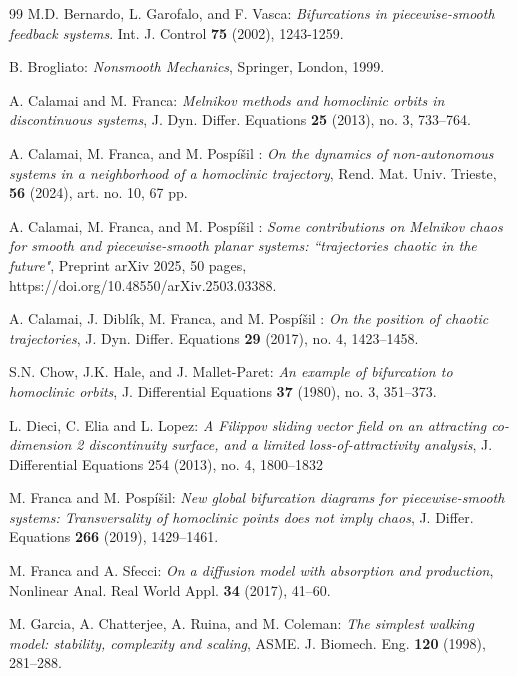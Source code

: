 \documentclass[10pt]{article}
\numberwithin{equation}{section}
\theoremstyle{definition}
\theoremstyle{remark}
\begin{document}
\begin{thebibliography}{99}
 {\sc M.D. Bernardo, L. Garofalo, and F. Vasca}: {\it Bifurcations in
piecewise-smooth feedback systems}. Int. J. Control \textbf{75} (2002),
1243-1259.

 {\sc B. Brogliato}: {\it Nonsmooth Mechanics}, Springer, London,
1999.

	 {\sc A. Calamai and M. Franca}: {\it Melnikov methods and homoclinic orbits in discontinuous systems},
	J. Dyn. Differ. Equations {\bf 25} (2013), no. 3, 733--764.
	
  {\sc A. Calamai, M. Franca, and M. Posp\' i\v sil }:   {\it On the dynamics of non-autonomous systems in a neighborhood of a homoclinic trajectory},
Rend. Mat. Univ. Trieste, {\bf 56} (2024), art. no. 10, 67 pp.
	


  {\sc A. Calamai, M. Franca, and M. Posp\' i\v sil }:  {\it Some contributions on Melnikov chaos for smooth and piecewise-smooth planar systems:
``trajectories chaotic in the future"},
Preprint arXiv 2025, 50 pages, https://doi.org/10.48550/arXiv.2503.03388.

	  {\sc A. Calamai, J. Dibl\' ik, M. Franca, and M. Posp\' i\v sil }: {\it On the position of chaotic trajectories},  J. Dyn.
Differ. Equations {\bf 29}
(2017), no. 4, 1423--1458.

 {\sc S.N. Chow, J.K. Hale, and J. Mallet-Paret}: {\it An example of bifurcation to homoclinic orbits},
J. Differential Equations {\bf 37} (1980), no. 3, 351--373.
	

      {\sc L. Dieci, C. Elia and L. Lopez}: {\it A Filippov sliding vector field on an attracting co-dimension 2 discontinuity
      surface, and a limited
      loss-of-attractivity analysis}, J. Differential Equations 254 (2013), no. 4, 1800--1832
	
	 {\sc  M. Franca and M. Posp\' i\v sil}: {\it New global bifurcation diagrams for piecewise-smooth systems: Transversality
of homoclinic points does not
imply chaos},
	J.  Differ. Equations {\bf 266} (2019), 1429--1461.

{\sc M. Franca and A. Sfecci}: {\it On a diffusion model with absorption and production},
Nonlinear Anal. Real World Appl. \textbf{34} (2017), 41--60.

 {\sc M. Garcia, A. Chatterjee, A. Ruina, and M. Coleman}: {\it The
simplest walking model: stability, complexity and scaling},
ASME. J. Biomech. Eng. \textbf{120} (1998), 281--288.


\end{thebibliography}
\end{document}
